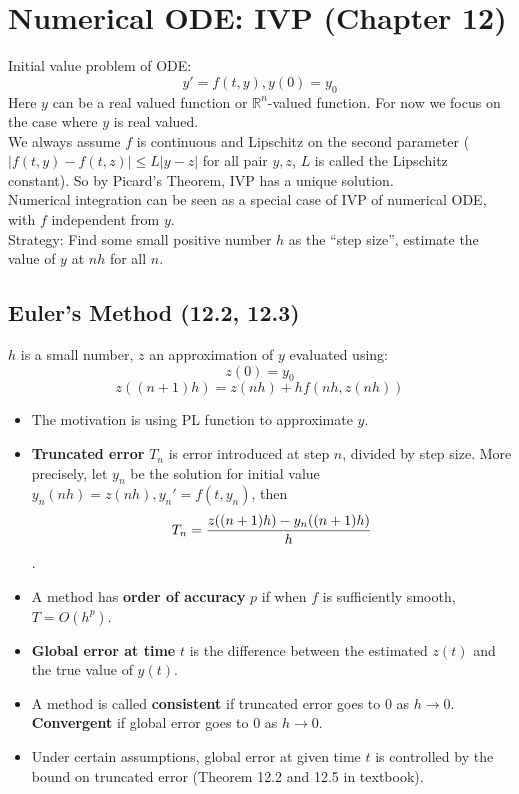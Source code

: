 \documentclass[20pt]{article} %
\theoremstyle{break}
\begin{document}
\newpage

\section{Numerical ODE: IVP (Chapter 12)}

Initial value problem of ODE:
\[y'=f(t, y), y(0)=y_0\]
Here $y$ can be a real valued function or $\mathbb{R}^n$-valued function. For now we focus on the case where $y$ is real valued.\\

We always assume $f$ is continuous and Lipschitz on the second parameter ($|f(t, y)-f(t, z)|\leq L|y-z|$ for all pair $y, z$, $L$ is called the Lipschitz constant). So by Picard's Theorem, IVP has a unique solution.\\

Numerical integration can be seen as a special case of IVP of numerical ODE, with $f$ independent from $y$.\\

Strategy: Find some small positive number $h$ as the ``step size'', estimate the value of $y$ at $nh$ for all $n$.\\

\newpage

\subsection{Euler's Method (12.2, 12.3)}

$h$ is a small number, $z$ an approximation of $y$ evaluated using:
\[z(0)=y_0\]
\[z((n+1)h)=z(nh)+hf(nh, z(nh))\]

\begin{itemize}
\item The motivation is using PL function to approximate $y$.
\item {\bf Truncated error} $T_n$ is error introduced at step $n$, divided by step size. More precisely, let $y_n$ be the solution for initial value $y_n(nh)=z(nh), y_n'=f(t, y_n)$, then
  \[T_n={z((n+1)h)-y_n((n+1)h)\over h}\]. 
\item A method has {\bf order of accuracy} $p$ if when $f$ is sufficiently smooth, $T=O(h^p)$.
\item {\bf Global error at time} $t$ is the difference between the estimated $z(t)$ and the true value of $y(t)$.
\item A method is called {\bf consistent} if truncated error goes to $0$ as $h\rightarrow 0$. {\bf Convergent} if global error goes to $0$ as $h\rightarrow 0$.
\item Under certain assumptions, global error at given time $t$ is controlled by the bound on truncated error (Theorem 12.2 and 12.5 in textbook).
\end{itemize}
\end{document}
